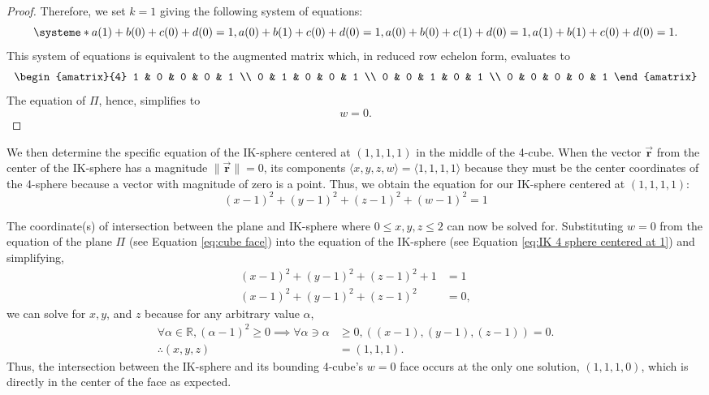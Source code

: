 \begin{proof}
    Therefore, we set $k=1$ giving the following system of equations:
    \begin{equation*}
        \systeme*{
        a(1)+b(0)+c(0)+d(0)=1,
        a(0)+b(1)+c(0)+d(0)=1,
        a(0)+b(0)+c(1)+d(0)=1,
        a(1)+b(1)+c(0)+d(0)=1.
        }
    \end{equation*}
    \noindent
    This system of equations is equivalent to the augmented matrix which, in reduced row echelon form, evaluates to
    \begin{align*}
        \begin{amatrix}{4}
            1 & 0 & 0 & 0 & 1 \\  
            0 & 1 & 0 & 0 & 1 \\
            0 & 0 & 1 & 0 & 1 \\
            0 & 0 & 0 & 0 & 1
        \end{amatrix}
    \end{align*}
    The equation of $\Pi$, hence, simplifies to
    \begin{equation*} %
        w=0.
    \end{equation*}
\end{proof}

We then determine the specific equation of the IK-sphere centered at $(1, 1, 1, 1)$ in the middle of the 4-cube. When the vector $\Vec{\mathbf{r}}$ from the center of the IK-sphere has a magnitude $\lVert\Vec{\mathbf{r}}\rVert=0$, its components $\langle x, y, z, w\rangle=\langle 1, 1, 1, 1\rangle$ because they must be the center coordinates of the 4-sphere because a vector with magnitude of zero is a point. Thus, we obtain the equation for our IK-sphere centered at $(1, 1, 1, 1)$: %
\begin{equation}\label{eq:IK 4 sphere centered at 1}
    (x-1)^2+(y-1)^2+(z-1)^2+(w-1)^2=1
\end{equation}

The coordinate(s) of intersection between the plane and IK-sphere where $0\leq x, y, z \leq 2$ can now be solved for. Substituting $w=0$ from the equation of the plane $\Pi$ (see Equation \ref{eq:cube face}) into the equation of the IK-sphere (see Equation \ref{eq:IK 4 sphere centered at 1}) and simplifying, 
\begin{align*}
    (x-1)^2+(y-1)^2+(z-1)^2+1&=1\\
    (x-1)^2+(y-1)^2+(z-1)^2&=0,
\end{align*}
we can solve for $x, y$, and $z$ because for any arbitrary value $\alpha$,
\begin{align*} %
    \forall  \alpha \in \mathbb{R}, (\alpha-1)^2 \geq 0 \implies \forall \alpha \ni \alpha &\geq 0, \left( (x-1), (y-1), (z-1)\right) = 0.\\
    \therefore (x, y, z)&=(1, 1, 1).
\end{align*}
Thus, the intersection between the IK-sphere and its bounding 4-cube's $w=0$ face occurs at the only one solution, $(1,1,1,0)$, which is directly in the center of the face as expected. 

